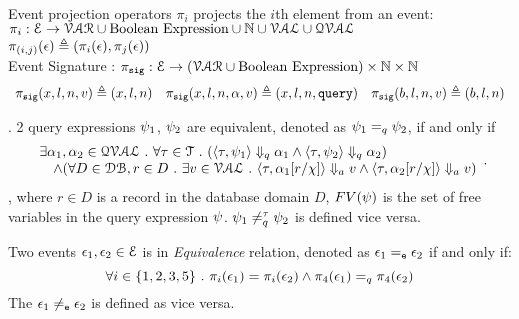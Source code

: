% 
\\
Event projection operators $\pi_i$ projects the $i$th element from an event: 
\\
$\pi_i : 
\mathcal{E} \to \mathcal{VAR}\cup \mbox{Boolean Expression} \cup \mathbb{N} \cup \mathcal{VAL} \cup \mathcal{QVAL} $
\\
$\pi_{(i,j)} (\mathtt{\epsilon}) \triangleq (\pi_i(\mathtt{\epsilon}), \pi_j(\mathtt{\epsilon})) $
%
\\
Event Signature : $\pi_{\mathtt{sig}} : \mathcal{E} \to (\mathcal{VAR}\cup \mbox{Boolean Expression}) \times\mathbb{N}\times \mathbb{N}$
\[
\begin{array}{lll}
\pi_{\mathtt{sig}} (x, l, n, v) \triangleq (x, l, n)
&
\pi_{\mathtt{sig}} (x, l, n, \alpha, v) \triangleq (x, l, n, {\tt query})
&
\pi_{\mathtt{sig}} (b, l, n, v)  \triangleq (b, l, n)
\end{array}
\]
%
%
\begin{defn}.
%
\label{def:query_equal}
2 query expressions $\psi_1$, $\psi_2$ are equivalent, denoted as $\psi_1 =_{q} \psi_2$, if and only if
$$
 \begin{array}{l} 
  \exists \alpha_1, \alpha_2 \in \mathcal{QVAL} ~.~ \forall \mathtt{\tau} \in \mathcal{T} ~.~
    (\langle \mathtt{\tau},  \psi_1 \rangle \Downarrow_q \alpha_1 \land \langle \mathtt{\tau},  \psi_2  \rangle \Downarrow_q \alpha_2) 
    \\
    \quad \land (\forall D \in \mathcal{DB}, r \in D ~.~ 
    \exists v \in \mathcal{VAL} ~.~ 
          \langle \mathtt{\tau}, \alpha_1[r/\chi] \rangle \Downarrow_a v \land \langle \mathtt{\tau},  \alpha_2[r/\chi]  \rangle \Downarrow_a v)  
  \end{array}.
$$
%
, where $r \in D$ is a record in the database domain $D$, $FV(\psi)$ is the set of free variables in the query expression $\psi$.
$\psi_1 \neq_{q}^{\mathtt{\tau}} \psi_2$  is defined vice versa.
%
\end{defn}
%
\begin{defn}
Two events $\mathtt{\epsilon}_1, \mathtt{\epsilon}_2 \in \mathcal{E}$ is in \emph{Equivalence} relation, denoted as $\mathtt{\epsilon}_1 =_{\mathtt{e}} \mathtt{\epsilon}_2$ if and only if:
\[
\forall i \in \{1, 2, 3, 5\} ~.~ \pi_{i}(\mathtt{\epsilon}_1) = \pi_{i}(\mathtt{\epsilon}_2) 
\land
\pi_{4}(\mathtt{\epsilon}_1) =_q \pi_{4}(\mathtt{\epsilon}_2)
\]
%
The $\mathtt{\epsilon}_1 \neq_{\mathtt{e}} \mathtt{\epsilon}_2$ is defined as vice versa.
\end{defn}
